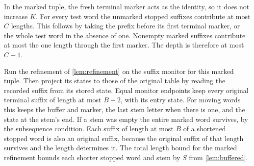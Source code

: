 In the marked tuple, the fresh terminal marker acts as the identity,
so it does not increase $K$. For every test word the unmarked
stopped suffixes contribute at most $C$ lengths. This follows
by taking the prefix before its first terminal marker, or the
whole test word in the absence of one. Nonempty marked suffixes
contribute at most the one length through the first marker.
The depth is therefore at most $C+1$.

Run the refinement of \cref{lem:refinement} on the suffix monitor
for this marked tuple. Then project its states to those of the
original table by reading the recorded suffix from its stored
state. Equal monitor endpoints keep every original terminal
suffix of length at most $B+2$, with its entry state. For moving
words this keeps the buffer and marker, the last stem letter
when there is one, and the state at the stem's end. If a stem
was empty the entire marked word survives, by the subsequence
condition. Each suffix of length at most $B$ of a shortened
stopped word is also an original suffix, because the original suffix
of that length survives and the length determines it. The total
length bound for the marked refinement bounds each shorter
stopped word and stem by $S$ from \cref{lem:buffered}.
